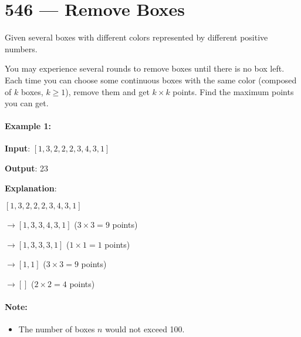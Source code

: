 \section{546 --- Remove Boxes}
Given several boxes with different colors represented by different positive numbers.

You may experience several rounds to remove boxes until there is no box left. Each time you can choose some continuous boxes with the same color (composed of $ k $ boxes, $k \geq 1$), remove them and get $k\times k$ points.
Find the maximum points you can get.

\paragraph{Example 1:}

\begin{flushleft}
\textbf{Input}: $[1, 3, 2, 2, 2, 3, 4, 3, 1]$

\textbf{Output}: 23

\textbf{Explanation}:

$[1, 3, 2, 2, 2, 3, 4, 3, 1] $

$\longrightarrow [1, 3, 3, 4, 3, 1]$ ($3\times 3=9$ points)

$\longrightarrow [1, 3, 3, 3, 1]$ ($1\times 1=1$ points)

$\longrightarrow [1,1]$ ($3\times 3=9$ points)

$\longrightarrow []$ ($2\times 2=4$ points)
\end{flushleft}

\paragraph{Note:} 
\begin{itemize}
\item The number of boxes $n$ would not exceed 100.
\end{itemize}
